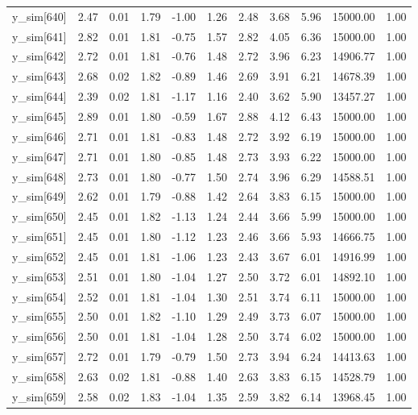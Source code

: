 \begin{table}[ht]
\begin{tabular}{rrrrrrrrrrr}
  y\_sim[640] & 2.47 & 0.01 & 1.79 & -1.00 & 1.26 & 2.48 & 3.68 & 5.96 & 15000.00 & 1.00 \\ 
  y\_sim[641] & 2.82 & 0.01 & 1.81 & -0.75 & 1.57 & 2.82 & 4.05 & 6.36 & 15000.00 & 1.00 \\ 
  y\_sim[642] & 2.72 & 0.01 & 1.81 & -0.76 & 1.48 & 2.72 & 3.96 & 6.23 & 14906.77 & 1.00 \\ 
  y\_sim[643] & 2.68 & 0.02 & 1.82 & -0.89 & 1.46 & 2.69 & 3.91 & 6.21 & 14678.39 & 1.00 \\ 
  y\_sim[644] & 2.39 & 0.02 & 1.81 & -1.17 & 1.16 & 2.40 & 3.62 & 5.90 & 13457.27 & 1.00 \\ 
  y\_sim[645] & 2.89 & 0.01 & 1.80 & -0.59 & 1.67 & 2.88 & 4.12 & 6.43 & 15000.00 & 1.00 \\ 
  y\_sim[646] & 2.71 & 0.01 & 1.81 & -0.83 & 1.48 & 2.72 & 3.92 & 6.19 & 15000.00 & 1.00 \\ 
  y\_sim[647] & 2.71 & 0.01 & 1.80 & -0.85 & 1.48 & 2.73 & 3.93 & 6.22 & 15000.00 & 1.00 \\ 
  y\_sim[648] & 2.73 & 0.01 & 1.80 & -0.77 & 1.50 & 2.74 & 3.96 & 6.29 & 14588.51 & 1.00 \\ 
  y\_sim[649] & 2.62 & 0.01 & 1.79 & -0.88 & 1.42 & 2.64 & 3.83 & 6.15 & 15000.00 & 1.00 \\ 
  y\_sim[650] & 2.45 & 0.01 & 1.82 & -1.13 & 1.24 & 2.44 & 3.66 & 5.99 & 15000.00 & 1.00 \\ 
  y\_sim[651] & 2.45 & 0.01 & 1.80 & -1.12 & 1.23 & 2.46 & 3.66 & 5.93 & 14666.75 & 1.00 \\ 
  y\_sim[652] & 2.45 & 0.01 & 1.81 & -1.06 & 1.23 & 2.43 & 3.67 & 6.01 & 14916.99 & 1.00 \\ 
  y\_sim[653] & 2.51 & 0.01 & 1.80 & -1.04 & 1.27 & 2.50 & 3.72 & 6.01 & 14892.10 & 1.00 \\ 
  y\_sim[654] & 2.52 & 0.01 & 1.81 & -1.04 & 1.30 & 2.51 & 3.74 & 6.11 & 15000.00 & 1.00 \\ 
  y\_sim[655] & 2.50 & 0.01 & 1.82 & -1.10 & 1.29 & 2.49 & 3.73 & 6.07 & 15000.00 & 1.00 \\ 
  y\_sim[656] & 2.50 & 0.01 & 1.81 & -1.04 & 1.28 & 2.50 & 3.74 & 6.02 & 15000.00 & 1.00 \\ 
  y\_sim[657] & 2.72 & 0.01 & 1.79 & -0.79 & 1.50 & 2.73 & 3.94 & 6.24 & 14413.63 & 1.00 \\ 
  y\_sim[658] & 2.63 & 0.02 & 1.81 & -0.88 & 1.40 & 2.63 & 3.83 & 6.15 & 14528.79 & 1.00 \\ 
  y\_sim[659] & 2.58 & 0.02 & 1.83 & -1.04 & 1.35 & 2.59 & 3.82 & 6.14 & 13968.45 & 1.00 \\ 

\end{tabular}
\end{table}
